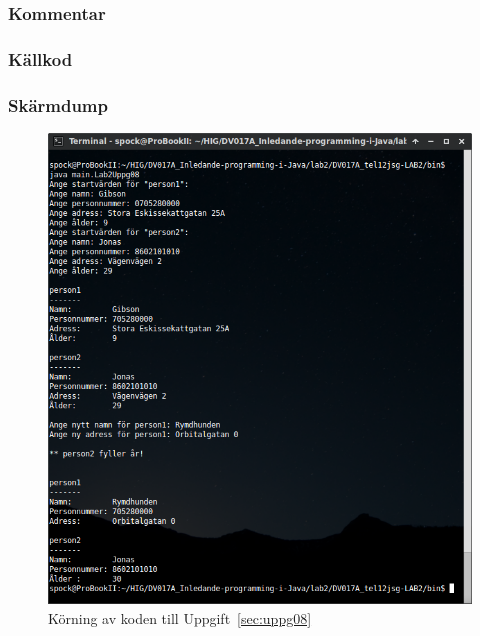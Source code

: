 \subsubsection{Kommentar}


\subsubsection{Källkod}
\label{src:uppg08}

\label{src:Person}


\subsubsection{Skärmdump}
\begin{figure}[htbp]
    \centering
        \includegraphics[width=\linewidth]{img/08.png}
    \caption{Körning av koden till Uppgift~\ref{sec:uppg08}}
    \label{fig:uppg08-screenshot}
\end{figure}

